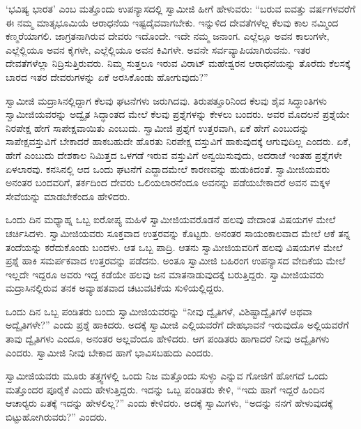 \vskip 2pt

 ‘ಭವಿಷ್ಯ ಭಾರತ’ ಎಂಬ ಮತ್ತೊಂದು ಉಪನ್ಯಾಸದಲ್ಲಿ ಸ್ವಾಮೀಜಿ ಹೀಗೆ ಹೇಳುವರು: “ಬರುವ ಐವತ್ತು ವರ್ಷಗಳವರೆಗೆ ಈ ನಮ್ಮ ಮಾತೃಭೂಮಿಯೆ ಆರಾಧನೆಯ ಇಷ್ಟದೈವವಾಗಬೇಕು. ಇನ್ನುಳಿದ ದೇವತೆಗಳೆಲ್ಲ ಕೆಲವು ಕಾಲ ನಮ್ಮಿಂದ ಕಣ್ಮರೆಯಾಗಲಿ. ಜಾಗ್ರತನಾಗಿರುವ ದೇವರು ಇದೊಂದೇ. ಇದೇ ನಮ್ಮ ಜನಾಂಗ. ಎಲ್ಲೆಲ್ಲೂ ಅವನ ಕಾಲುಗಳೇ, ಎಲ್ಲೆಲ್ಲಿಯೂ ಅವನ ಕೈಗಳೇ, ಎಲ್ಲೆಲ್ಲಿಯೂ ಅವನ ಕಿವಿಗಳೇ. ಅವನೇ ಸರ್ವವ್ಯಾಪಿಯಾಗಿರುವನು. ಇತರ ದೇವತೆಗಳೆಲ್ಲಾ ನಿದ್ರಿಸುತ್ತಿರುವರು. ನಿಮ್ಮ ಸುತ್ತಲೂ ಇರುವ ವಿರಾಟ್ ಮಹೇಶ್ವರನ ಆರಾಧನೆಯನ್ನು ತೊರೆದು ಕೆಲಸಕ್ಕೆ ಬಾರದ ಇತರ ದೇವರುಗಳನ್ನು ಏಕೆ ಅರಸಿಕೊಂಡು ಹೋಗುವುದು?” 

\newpage

 ಸ್ವಾಮೀಜಿ ಮದ್ರಾಸಿನಲ್ಲಿದ್ದಾಗ ಕೆಲವು ಘಟನೆಗಳು ಜರುಗಿದವು. ತಿರುಪತ್ತೂರಿನಿಂದ ಕೆಲವು ಶೈವ ಸಿದ್ಧಾಂತಿಗಳು ಸ್ವಾಮೀಜಿಯವರನ್ನು ಅದ್ವೈತ ಸಿದ್ಧಾಂತದ ಮೇಲೆ ಕೆಲವು ಪ್ರಶ್ನೆಗಳನ್ನು ಕೇಳಲು ಬಂದರು. ಅವರ ಮೊದಲನೆ ಪ್ರಶ್ನೆಯೇ ನಿರಪೇಕ್ಷ ಹೇಗೆ ಸಾಪೇಕ್ಷವಾಯಿತು ಎಂಬುದು. ಸ್ವಾಮೀಜಿ ಪ್ರಶ್ನೆಗೆ ಉತ್ತರವಾಗಿ, ಏಕೆ ಹೇಗೆ ಎಂಬುದನ್ನು ಸಾಪೇಕ್ಷವಸ್ತುವಿಗೆ ಬೇಕಾದರೆ ಹಾಕಬಹುದೇ ಹೊರತು ನಿರಪೇಕ್ಷ ವಸ್ತುವಿಗೆ ಹಾಕುವುದಕ್ಕೆ ಆಗುವುದಿಲ್ಲ ಎಂದರು. ಏಕೆ, ಹೇಗೆ ಎಂಬುದು ದೇಶಕಾಲ ನಿಮಿತ್ತದ ಒಳಗಡೆ ಇರುವ ವಸ್ತುವಿಗೆ ಅನ್ವಯಿಸುವುದು, ಅದರಾಚೆ ಇಂತಹ ಪ್ರಶ್ನೆಗಳೇ ಏಳಲಾರವು. ಕನಸಿನಲ್ಲಿ ಆದ ಒಂದು ಘಟನೆಗೆ ಎದ್ದಾದಮೇಲೆ ಕಾರಣವನ್ನು ಹುಡುಕಿದಂತೆ. ಸ್ವಾಮೀಜಿಯವರು ಅನಂತರ ಬಂದವರಿಗೆ, ತರ್ಕದಿಂದ ದೇವರು ಒಲಿಯಲಾರನೆಂದೂ ಅವನನ್ನು ಪಡೆಯಬೇಕಾದರೆ ಅವನ ಮಕ್ಕಳ ಸೇವೆಯನ್ನು ಮಾಡಬೇಕೆಂದೂ ಹೇಳಿದರು. 

\vskip 2pt

 ಒಂದು ದಿನ ಮಧ್ಯಾಹ್ನ ಒಬ್ಬ ಐರೋಪ್ಯ ಮಹಿಳೆ ಸ್ವಾಮೀಜಿಯವರೊಡನೆ ಹಲವು ವೇದಾಂತ ವಿಷಯಗಳ ಮೇಲೆ ಚರ್ಚಿಸಿದಳು. ಸ್ವಾಮೀಜಿಯವರು ಸೂಕ್ತವಾದ ಉತ್ತರವನ್ನು ಕೊಟ್ಟರು. ಅನಂತರ ಸಾಯಂಕಾಲವಾದ ಮೇಲೆ ಆಕೆ ತನ್ನ ತಂದೆಯನ್ನು ಕರೆದುಕೊಂಡು ಬಂದಳು. ಆತ ಒಬ್ಬ ಪಾದ್ರಿ. ಆತನು ಸ್ವಾಮೀಜಿಯವರಿಗೆ ಹಲವು ವಿಷಯಗಳ ಮೇಲೆ ಪ್ರಶ್ನೆ ಹಾಕಿ ಸಮರ್ಪಕವಾದ ಉತ್ತರವನ್ನು ಪಡೆದನು. ಅಂತೂ ಸ್ವಾಮೀಜಿ ಬಹಿರಂಗ ಉಪನ್ಯಾಸದ ವೇದಿಕೆಯ ಮೇಲೆ ಇಲ್ಲದೇ ಇದ್ದರೂ ಅವರು ಇದ್ದ ಕಡೆಯೇ ಹಲವು ಜನ ಮಾತನಾಡುವುದಕ್ಕೆ ಬರುತ್ತಿದ್ದರು. ಸ್ವಾಮೀಜಿಯವರು ಮದ್ರಾಸಿನಲ್ಲಿರುವ ತನಕ ಅವ್ಯಾಹತವಾದ ಚಟುವಟಿಕೆಯ ಸುಳಿಯಲ್ಲಿದ್ದರು. 

\vskip 2pt

 ಒಂದು ದಿನ ಒಬ್ಬ ಪಂಡಿತರು ಬಂದು ಸ್ವಾಮೀಜಿಯವರನ್ನು “ನೀವು ದ್ವೈತಿಗಳೆ, ವಿಶಿಷ್ಟಾದ್ವೈತಿಗಳೆ ಅಥವಾ ಅದ್ವೈತಿಗಳೇ?” ಎಂದು ಪ್ರಶ್ನೆ ಹಾಕಿದರು. ಅದಕ್ಕೆ ಸ್ವಾಮೀಜಿ ಎಲ್ಲಿಯವರೆಗೆ ದೇಹಭಾವನೆ ಇರುವುದೊ ಅಲ್ಲಿಯವರೆಗೆ ತಾವು ದ್ವೈತಿಗಳು ಎಂದೂ, ಅನಂತರ ಅಲ್ಲವೆಂದೂ ಹೇಳಿದರು. ಆಗ ಪಂಡಿತರು ಹಾಗಾದರೆ ನೀವು ಅದ್ವೈತಿಗಳು ಎಂದರು. ಸ್ವಾಮೀಜಿ ನೀವು ಬೇಕಾದ ಹಾಗೆ ಭಾವಿಸಬಹುದು ಎಂದರು. 

\vskip 2pt

 ಸ್ವಾಮೀಜಿಯವರು ಮೂರು ತತ್ತ್ವಗಳಲ್ಲಿ ಒಂದು ನಿಜ ಮತ್ತೊಂದು ಸುಳ್ಳು ಎನ್ನುವ ಗೋಜಿಗೆ ಹೋಗದೆ ಒಂದು ಮತ್ತೊಂದರ ಪೂರೈಕೆ ಎಂದು ಹೇಳುತ್ತಿದ್ದರು. ಇದನ್ನು ಒಬ್ಬ ಪಂಡಿತರು ಕೇಳಿ, “ಇದು ಹಾಗೆ ಇದ್ದರೆ ಹಿಂದಿನ ಆಚಾರ‍್ಯರು ಏತಕ್ಕೆ ಇದನ್ನು ಹೇಳಲಿಲ್ಲ?” ಎಂದು ಕೇಳಿದರು. ಅದಕ್ಕೆ ಸ್ವಾಮಿಗಳು, “ಅದನ್ನು ನನಗೆ ಹೇಳುವುದಕ್ಕೆ ಬಿಟ್ಟುಹೋಗಿರುವರು?” ಎಂದರು. 

